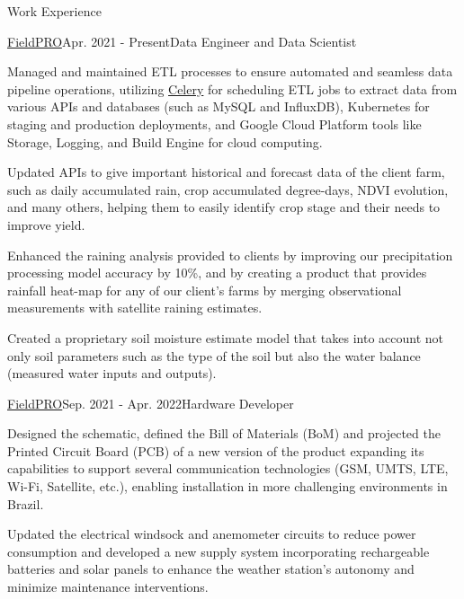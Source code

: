 \documentclass{resume} %
\begin{document}
\begin{rSection}{Work Experience}
\begin{rSubsection}{\href{https://fieldpro.com.br/}{FieldPRO}}{Apr. 2021 - Present}{Data Engineer and Data Scientist}{}
\item Managed and maintained ETL processes to ensure automated and seamless data pipeline operations, utilizing \href{https://docs.celeryq.dev/en/stable/getting-started/introduction.html}{Celery} for scheduling ETL jobs to extract data from various APIs and databases (such as MySQL and InfluxDB), Kubernetes for staging and production deployments, and Google Cloud Platform tools like Storage, Logging, and Build Engine for cloud computing.
\item Updated APIs to give important historical and forecast data of the client farm, such as daily accumulated rain, crop accumulated degree-days, NDVI evolution, and many others, helping them to easily identify crop stage and their needs to improve yield.%
\item Enhanced the raining analysis provided to clients by improving our precipitation processing model accuracy by 10\%, and by creating a product that provides rainfall heat-map for any of our client's farms by merging observational measurements with satellite raining estimates.
\item Created a proprietary soil moisture estimate model that takes into account not only soil parameters such as the type of the soil but also the water balance (measured water inputs and outputs).

\end{rSubsection}

\begin{rSubsection}{\href{https://fieldpro.com.br/}{FieldPRO}}{Sep. 2021 - Apr. 2022}{Hardware Developer}{}

\item Designed the schematic, defined the Bill of Materials (BoM) and projected the Printed Circuit Board (PCB) of a new version of the product expanding its capabilities to support several communication technologies (GSM, UMTS, LTE, Wi-Fi, Satellite, etc.), enabling installation in more challenging environments in Brazil.
\item Updated the electrical windsock and anemometer circuits to reduce power consumption and developed a new supply system incorporating rechargeable batteries and solar panels to enhance the weather station's autonomy and minimize maintenance interventions.
\end{rSubsection}


\end{rSection}
\end{document}
